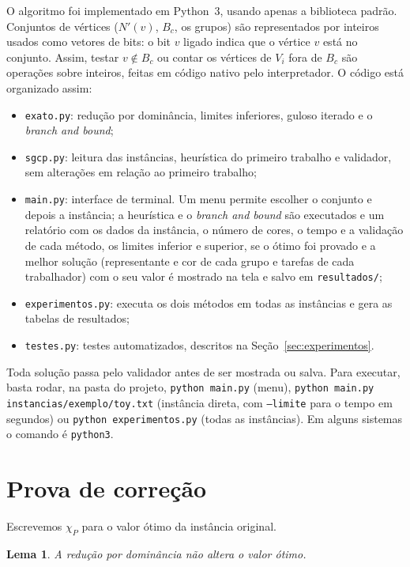 \documentclass[12pt]{article}
\newtheorem{lema}{Lema}
\newcommand{\chiP}{\chi_P}
\begin{document}
O algoritmo foi implementado em Python~3, usando apenas a biblioteca padrão.
Conjuntos de vértices ($N'(v)$, $B_c$, os grupos) são representados por
inteiros usados como vetores de bits: o bit $v$ ligado indica que o vértice $v$
está no conjunto. Assim, testar $v\notin B_c$ ou contar os vértices de $V_i$
fora de $B_c$ são operações sobre inteiros, feitas em código nativo pelo
interpretador. O código está organizado assim:
\begin{itemize}
  \item \texttt{exato.py}: redução por dominância, limites inferiores, guloso
    iterado e o \emph{branch and bound};
  \item \texttt{sgcp.py}: leitura das instâncias, heurística do primeiro
    trabalho e validador, sem alterações em relação ao primeiro trabalho;
  \item \texttt{main.py}: interface de terminal. Um menu permite escolher o
    conjunto e depois a instância; a heurística e o \emph{branch and bound}
    são executados e um relatório com os dados da instância, o número de cores,
    o tempo e a validação de cada método, os limites inferior e superior, se o
    ótimo foi provado e a melhor solução (representante e cor de cada grupo e
    tarefas de cada trabalhador) com o seu valor é mostrado na tela e salvo em
    \texttt{resultados/};
  \item \texttt{experimentos.py}: executa os dois métodos em todas as
    instâncias e gera as tabelas de resultados;
  \item \texttt{testes.py}: testes automatizados, descritos na
    Seção~\ref{sec:experimentos}.
\end{itemize}
Toda solução passa pelo validador antes de ser mostrada ou salva. Para
executar, basta rodar, na pasta do projeto, \texttt{python main.py} (menu),
\texttt{python main.py instancias/exemplo/toy.txt} (instância direta, com
\texttt{--limite} para o tempo em segundos) ou \texttt{python experimentos.py}
(todas as instâncias). Em alguns sistemas o comando é \texttt{python3}.

\section{Prova de correção}\label{sec:correcao}

Escrevemos $\chiP$ para o valor ótimo da instância original.

\begin{lema}\label{lem:dominancia}
  A redução por dominância não altera o valor ótimo.
\end{lema}
\end{document}
